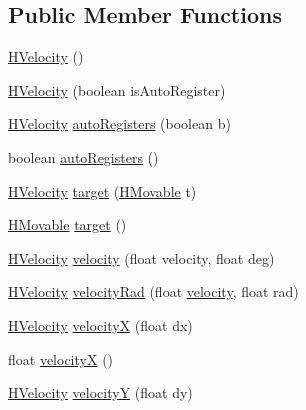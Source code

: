 \subsection*{Public Member Functions}
\begin{DoxyCompactItemize}
\item 
\hyperlink{classhype_1_1behavior_1_1_h_velocity_a2b405b29380bb222ef394307943597a1}{H\-Velocity} ()
\item 
\hyperlink{classhype_1_1behavior_1_1_h_velocity_a067a4ac0bfad5766b5cca18d11c0262f}{H\-Velocity} (boolean is\-Auto\-Register)
\item 
\hyperlink{classhype_1_1behavior_1_1_h_velocity}{H\-Velocity} \hyperlink{classhype_1_1behavior_1_1_h_velocity_a1397d4e380ef7c9fc693ee199e269d94}{auto\-Registers} (boolean b)
\item 
boolean \hyperlink{classhype_1_1behavior_1_1_h_velocity_a678bf4387901792c45ac4c5bd3d9aba9}{auto\-Registers} ()
\item 
\hyperlink{classhype_1_1behavior_1_1_h_velocity}{H\-Velocity} \hyperlink{classhype_1_1behavior_1_1_h_velocity_aebfb1b70ee448ac143ae91989fc57b4f}{target} (\hyperlink{interfacehype_1_1interfaces_1_1_h_movable}{H\-Movable} t)
\item 
\hyperlink{interfacehype_1_1interfaces_1_1_h_movable}{H\-Movable} \hyperlink{classhype_1_1behavior_1_1_h_velocity_af6f8280c525fcab215c183548cd0aac7}{target} ()
\item 
\hyperlink{classhype_1_1behavior_1_1_h_velocity}{H\-Velocity} \hyperlink{classhype_1_1behavior_1_1_h_velocity_a36b66735ab829dbcaee5008515651179}{velocity} (float velocity, float deg)
\item 
\hyperlink{classhype_1_1behavior_1_1_h_velocity}{H\-Velocity} \hyperlink{classhype_1_1behavior_1_1_h_velocity_a366e0c7fb70949d1a81d68ea65f78a38}{velocity\-Rad} (float \hyperlink{classhype_1_1behavior_1_1_h_velocity_a36b66735ab829dbcaee5008515651179}{velocity}, float rad)
\item 
\hyperlink{classhype_1_1behavior_1_1_h_velocity}{H\-Velocity} \hyperlink{classhype_1_1behavior_1_1_h_velocity_a0bc49a845f80bada67082e07334f2472}{velocity\-X} (float dx)
\item 
float \hyperlink{classhype_1_1behavior_1_1_h_velocity_a469184301800322041f55f972829494b}{velocity\-X} ()
\item 
\hyperlink{classhype_1_1behavior_1_1_h_velocity}{H\-Velocity} \hyperlink{classhype_1_1behavior_1_1_h_velocity_afbb6fed1e65bef526d495911d8c1acf3}{velocity\-Y} (float dy)
\item 

\end{DoxyCompactItemize}
